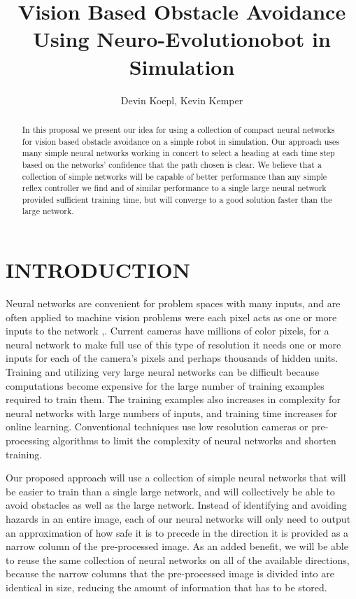 \documentclass[letterpaper, 10 pt, conference]{ieeeconf}
\title{\LARGE \bf
  Vision Based Obstacle Avoidance Using Neuro-Evolutionobot in Simulation
}
\author{Devin Koepl, Kevin Kemper}
\begin{document}
	\maketitle

	\begin{abstract}

		In this proposal we present our idea for using a collection of compact neural networks for vision based obstacle avoidance on a simple robot in simulation. Our approach uses many simple neural networks working in concert to select a heading at each time step based on the networks' confidence that the path chosen is clear.  We believe that a collection of simple networks will be capable of better performance than any simple reflex controller we find and of similar performance to a single large neural network provided sufficient training time, but will converge to a good solution faster than the large network.

	\end{abstract}

	\section*{INTRODUCTION}

		Neural networks are convenient for problem spaces with many inputs, and are often applied to machine vision problems were each pixel acts as one or more inputs to the network \cite{Pomerleau93_NNforVehicles},\cite{EgmontPetersen2002imageprocessingNN}.  Current cameras have millions of color pixels, for a neural network to make full use of this type of resolution it needs one or more inputs for each of the camera's pixels and perhaps thousands of hidden units.  Training and utilizing very large neural networks can be difficult because computations become expensive for the large number of training examples required to train them. The training examples also increases in complexity for neural networks with large numbers of inputs, and training time increases for online learning. Conventional techniques use low resolution cameras or pre-processing algorithms to limit the complexity of neural networks and shorten training.

		Our proposed approach will use a collection of simple neural networks that will be easier to train than a single large network, and will collectively be able to avoid obstacles as well as the large network.  Instead of identifying and avoiding hazards in an entire image, each of our neural networks will only need to output an approximation of how safe it is to precede in the direction it is provided as a narrow column of the pre-processed image.  As an added benefit, we will be able to reuse the same collection of neural networks on all of the available directions, because the narrow columns that the pre-processed image is divided into are identical in size, reducing the amount of information that has to be stored.
\end{document}
